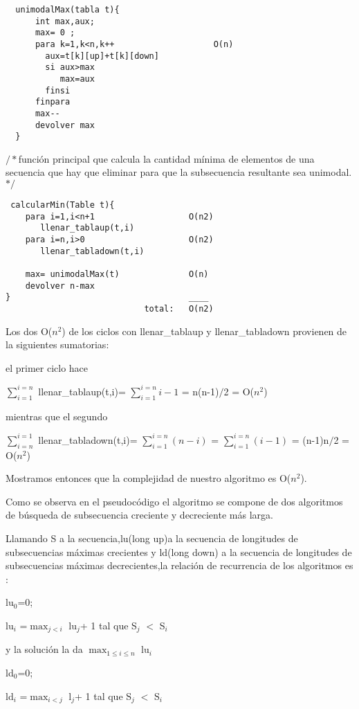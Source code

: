 \begin{verbatim}
  unimodalMax(tabla t){
      int max,aux; 	
      max= 0 ;
      para k=1,k<n,k++                    O(n)
	    aux=t[k][up]+t[k][down]
	    si aux>max 
	       max=aux
	    finsi 
	  finpara
	  max-- 
      devolver max
  }
\end{verbatim}


$/*$función principal que calcula la cantidad mínima de elementos de una secuencia que hay que eliminar para que la subsecuencia resultante sea unimodal.$*/$

\begin{verbatim}
 calcularMin(Table t){
    para i=1,i<n+1                   O(n2)
       llenar_tablaup(t,i) 
    para i=n,i>0                     O(n2)
       llenar_tabladown(t,i)
    
    max= unimodalMax(t)              O(n)
    devolver n-max   
}                                    ____
                            total:   O(n2)
\end{verbatim}                       

Los dos O($n^{2}$) de los ciclos con llenar\_tablaup y llenar\_tabladown provienen de la siguientes sumatorias:

el primer ciclo hace

$\sum_{i=1}^{i=n}$ llenar\_tablaup(t,i)= $\sum_{i=1}^{i=n} i-1 $ = n(n-1)$/$2 = O($n^{2}$)

mientras que el segundo

$\sum_{i=n}^{i=1}$ llenar\_tabladown(t,i)= $\sum_{i=1}^{i=n}(n-i)$ = $\sum_{i=1}^{i=n}(i-1)$ = (n-1)n$/$2 = O($n^{2}$)
                       
Mostramos entonces que la complejidad de nuestro algoritmo es O($n^{2}$).

Como se observa en el pseudocódigo el algoritmo se compone de dos algoritmos de búsqueda de subsecuencia creciente y decreciente más larga.

Llamando S a la secuencia,lu(long up)a la secuencia de longitudes de subsecuencias máximas crecientes  y ld(long down) a la secuencia de longitudes de subsecuencias máximas decrecientes,la relación de recurrencia de los algoritmos es :

lu$_0$=0;

lu$_i$ =$\max_{j<i}$ lu$_j$+ 1  tal que S$_j$ $<$ S$_i$  

y la solución la da $\max_{1\leq i\leq n}$ lu$_i$

ld$_0$=0;

ld$_i$ =$\max_{i<j}$ l$_j$+ 1  tal que S$_j$ $<$ S$_i$ 

